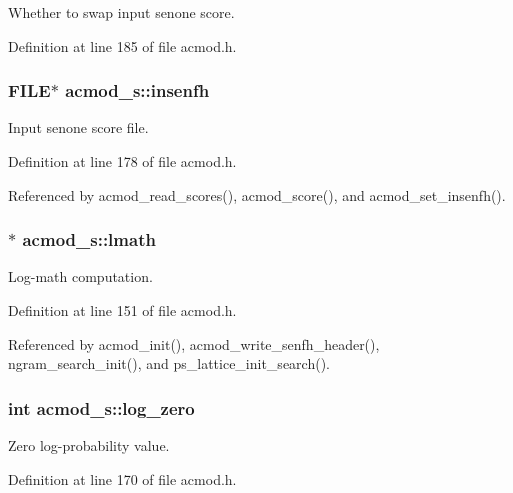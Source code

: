 Whether to swap input senone score. 



Definition at line 185 of file acmod.\-h.

\subsubsection[{insenfh}]{\setlength{\rightskip}{0pt plus 5cm}F\-I\-L\-E$\ast$ acmod\-\_\-s\-::insenfh}\label{structacmod__s_ad0998a9d887db82bd684e9454c9b044e}


Input senone score file. 



Definition at line 178 of file acmod.\-h.



Referenced by acmod\-\_\-read\-\_\-scores(), acmod\-\_\-score(), and acmod\-\_\-set\-\_\-insenfh().

\subsubsection[{lmath}]{$\ast$ acmod\-\_\-s\-::lmath}\label{structacmod__s_a9de7e8ac9c0c4df3d2a9ad5406787f3c}


Log-\/math computation. 



Definition at line 151 of file acmod.\-h.



Referenced by acmod\-\_\-init(), acmod\-\_\-write\-\_\-senfh\-\_\-header(), ngram\-\_\-search\-\_\-init(), and ps\-\_\-lattice\-\_\-init\-\_\-search().

\subsubsection[{log\-\_\-zero}]{\setlength{\rightskip}{0pt plus 5cm}int acmod\-\_\-s\-::log\-\_\-zero}\label{structacmod__s_a95d5195647b6395d95433d45e3f74d51}


Zero log-\/probability value. 



Definition at line 170 of file acmod.\-h.



